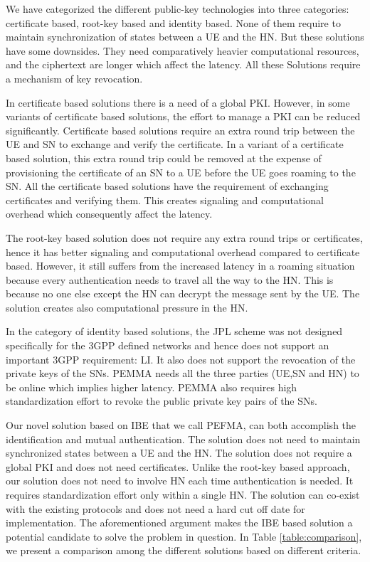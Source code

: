 \documentclass{river-journal}
\begin{document}
We have categorized the different public-key technologies into three categories: certificate based, root-key based and identity based. None of them require to maintain synchronization of states between a UE and the HN. But these solutions have some downsides. They need comparatively heavier computational resources, and the ciphertext are longer which affect the latency. All these Solutions require a mechanism of key revocation.

In certificate based solutions there is a need of a global PKI. However, in some variants of certificate based solutions, the effort to manage a PKI can be reduced significantly. Certificate based solutions require an extra round trip between the UE and SN to exchange and verify the certificate. In a variant of a certificate based solution, this extra round trip could be removed at the expense of provisioning the certificate of an SN to a UE before the UE goes roaming to the SN. All the certificate based solutions have the requirement of exchanging certificates and verifying them. This creates signaling and computational overhead which consequently affect the latency. 

The root-key based solution does not require any extra round trips or certificates, hence it has better signaling and computational overhead compared to certificate based. However, it still suffers from the increased latency in a roaming situation because every authentication needs to travel all the way to the HN. This is because no one else except the HN can decrypt the message sent by the UE. The solution creates also computational pressure in the HN. 

In the category of identity based solutions, the JPL scheme was not designed specifically for the 3GPP defined networks and hence does not support an important 3GPP requirement: LI. It also does not support the revocation of the private keys of the SNs. PEMMA needs all the three parties (UE,SN and HN) to be online which implies higher latency. PEMMA also requires high standardization effort to revoke the public private key pairs of the SNs.

Our novel solution based on IBE that we call PEFMA, can both accomplish the identification and mutual authentication. The solution does not need to maintain synchronized states between a UE and the HN. The solution does not require a global PKI and does not need certificates. Unlike the root-key based approach, our solution does not need to involve HN each time authentication is needed. It requires standardization effort only within a single HN. The solution can co-exist with the existing protocols and does not need a hard cut off date for implementation. The aforementioned argument makes the IBE based solution a potential candidate to solve the problem in question. In Table \ref{table:comparison}, we present a comparison among the different solutions based on different criteria.
\end{document}
